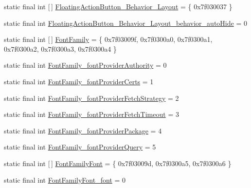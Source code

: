 \begin{DoxyCompactItemize}
\item 
static final int \mbox{[}$\,$\mbox{]} \mbox{\hyperlink{classandroid_1_1support_1_1design_1_1R_1_1styleable_af52e2282b9cb1275b67fa2a2c154282c}{Floating\+Action\+Button\+\_\+\+Behavior\+\_\+\+Layout}} = \{ 0x7f030037 \}
\item 
static final int \mbox{\hyperlink{classandroid_1_1support_1_1design_1_1R_1_1styleable_a6f83019ae564bc7d5a075bd5e9c5c44d}{Floating\+Action\+Button\+\_\+\+Behavior\+\_\+\+Layout\+\_\+behavior\+\_\+auto\+Hide}} = 0
\item 
static final int \mbox{[}$\,$\mbox{]} \mbox{\hyperlink{classandroid_1_1support_1_1design_1_1R_1_1styleable_ab347d6fcd4d1212c1dcaa6c3f6c7f597}{Font\+Family}} = \{ 0x7f03009f, 0x7f0300a0, 0x7f0300a1, 0x7f0300a2, 0x7f0300a3, 0x7f0300a4 \}
\item 
static final int \mbox{\hyperlink{classandroid_1_1support_1_1design_1_1R_1_1styleable_ad48d6c1976cd4c19100912d9ff1a5638}{Font\+Family\+\_\+font\+Provider\+Authority}} = 0
\item 
static final int \mbox{\hyperlink{classandroid_1_1support_1_1design_1_1R_1_1styleable_ad6dbe81ac8fcc4834009dec1b99e0657}{Font\+Family\+\_\+font\+Provider\+Certs}} = 1
\item 
static final int \mbox{\hyperlink{classandroid_1_1support_1_1design_1_1R_1_1styleable_af9ed5f2c20dae380b2d3158640177ff2}{Font\+Family\+\_\+font\+Provider\+Fetch\+Strategy}} = 2
\item 
static final int \mbox{\hyperlink{classandroid_1_1support_1_1design_1_1R_1_1styleable_a2ea6e17c7a04c7d06e106f3266256687}{Font\+Family\+\_\+font\+Provider\+Fetch\+Timeout}} = 3
\item 
static final int \mbox{\hyperlink{classandroid_1_1support_1_1design_1_1R_1_1styleable_a5e5338b1eec839ae92c950a037b00a0d}{Font\+Family\+\_\+font\+Provider\+Package}} = 4
\item 
static final int \mbox{\hyperlink{classandroid_1_1support_1_1design_1_1R_1_1styleable_ae5bf61893247cd75d621dc7bb25fecb1}{Font\+Family\+\_\+font\+Provider\+Query}} = 5
\item 
static final int \mbox{[}$\,$\mbox{]} \mbox{\hyperlink{classandroid_1_1support_1_1design_1_1R_1_1styleable_a09598df35098c4c5ad3068090156e241}{Font\+Family\+Font}} = \{ 0x7f03009d, 0x7f0300a5, 0x7f0300a6 \}
\item 
static final int \mbox{\hyperlink{classandroid_1_1support_1_1design_1_1R_1_1styleable_ab911c016f3afffc49bc4c7c145287d3c}{Font\+Family\+Font\+\_\+font}} = 0
\item 

\end{DoxyCompactItemize}

